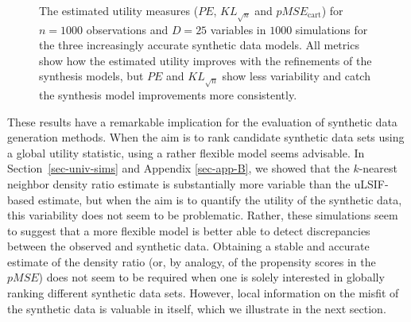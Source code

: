 \documentclass[
]{article}
\begin{document}
\begin{figure}[t]


\caption{\label{fig-sim2-results}The estimated utility measures (\(PE\),
\(KL_{\sqrt{n}}\) and \(pMSE_{\text{cart}}\)) for \(n = 1000\)
observations and \(D = 25\) variables in \(1000\) simulations for the
three increasingly accurate synthetic data models. All metrics show how
the estimated utility improves with the refinements of the synthesis
models, but \(PE\) and \(KL_{\sqrt{n}}\) show less variability and catch
the synthesis model improvements more consistently.}

\end{figure}%

\linespread{2}

These results have a remarkable implication for the evaluation of
synthetic data generation methods. When the aim is to rank candidate
synthetic data sets using a global utility statistic, using a rather
flexible model seems advisable. In Section~\ref{sec-univ-sims} and
Appendix \ref{sec-app-B}, we showed that the \(k\)-nearest neighbor
density ratio estimate is substantially more variable than the
uLSIF-based estimate, but when the aim is to quantify the utility of the
synthetic data, this variability does not seem to be problematic.
Rather, these simulations seem to suggest that a more flexible model is
better able to detect discrepancies between the observed and synthetic
data. Obtaining a stable and accurate estimate of the density ratio (or,
by analogy, of the propensity scores in the \(pMSE\)) does not seem to
be required when one is solely interested in globally ranking different
synthetic data sets. However, local information on the misfit of the
synthetic data is valuable in itself, which we illustrate in the next
section.
\end{document}
